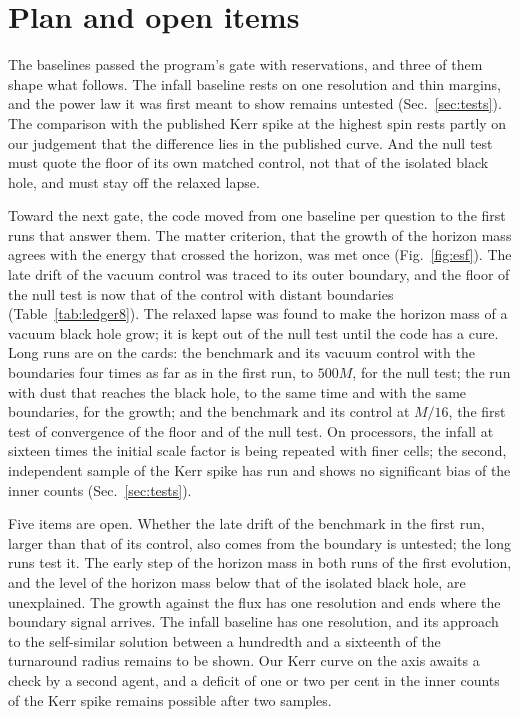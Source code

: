 \documentclass[aps,prd,twocolumn,10pt,superscriptaddress,nofootinbib,longbibliography,floatfix]{revtex4-2}
\begin{document}
\section{Plan and open items}\label{sec:plan}

The baselines passed the program's gate with reservations, and three of them shape what follows. The infall baseline rests on one resolution and thin margins, and the power law it was first meant to show remains untested (Sec.~\ref{sec:tests}). The comparison with the published Kerr spike at the highest spin rests partly on our judgement that the difference lies in the published curve. And the null test must quote the floor of its own matched control, not that of the isolated black hole, and must stay off the relaxed lapse.

Toward the next gate, the code moved from one baseline per question to the first runs that answer them. The matter criterion, that the growth of the horizon mass agrees with the energy that crossed the horizon, was met once (Fig.~\ref{fig:esf}). The late drift of the vacuum control was traced to its outer boundary, and the floor of the null test is now that of the control with distant boundaries (Table~\ref{tab:ledger8}). The relaxed lapse was found to make the horizon mass of a vacuum black hole grow; it is kept out of the null test until the code has a cure. Long runs are on the cards: the benchmark and its vacuum control with the boundaries four times as far as in the first run, to $500M$, for the null test; the run with dust that reaches the black hole, to the same time and with the same boundaries, for the growth; and the benchmark and its control at $M/16$, the first test of convergence of the floor and of the null test. On processors, the infall at sixteen times the initial scale factor is being repeated with finer cells; the second, independent sample of the Kerr spike has run and shows no significant bias of the inner counts (Sec.~\ref{sec:tests}).

Five items are open. Whether the late drift of the benchmark in the first run, larger than that of its control, also comes from the boundary is untested; the long runs test it. The early step of the horizon mass in both runs of the first evolution, and the level of the horizon mass below that of the isolated black hole, are unexplained. The growth against the flux has one resolution and ends where the boundary signal arrives. The infall baseline has one resolution, and its approach to the self-similar solution between a hundredth and a sixteenth of the turnaround radius remains to be shown. Our Kerr curve on the axis awaits a check by a second agent, and a deficit of one or two per cent in the inner counts of the Kerr spike remains possible after two samples.
\end{document}

